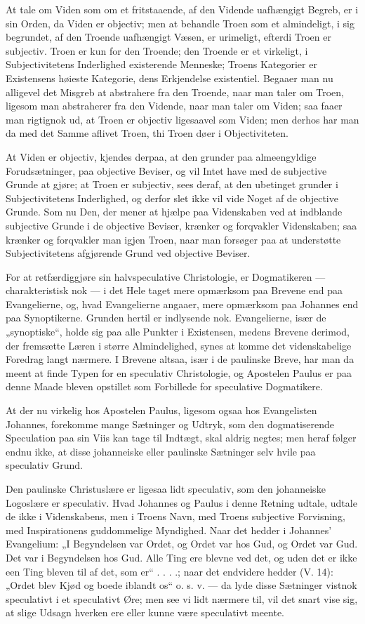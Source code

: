 \documentclass[12pt,a4paper]{book}
\newcommand{\opage}[1]{\marginnote{\footnotesize\textit{[#1]}}}
\begin{document}
At tale om Viden som om et fritstaaende, af den Vidende uafhængigt Begreb,
er i sin Orden, da Viden er objectiv; men at behandle Troen som et
almindeligt, i sig begrundet, af den Troende uafhængigt Væsen, er
urimeligt, efterdi Troen er subjectiv. Troen er kun for den Troende; den
Troende er et virkeligt, i Subjectivitetens Inderlighed existerende
Menneske; Troens Kategorier er Existensens høieste Kategorie, dens
Erkjendelse existentiel. Begaaer man nu alligevel det Misgreb at abstrahere
fra den Troende, naar man taler om Troen, ligesom man abstraherer fra den
Vidende, naar man taler om Viden; saa faaer man rigtignok ud, at Troen er
objectiv ligesaavel som Viden; men derhos har man da med det Samme aflivet
Troen, thi Troen døer i Objectiviteten.

At Viden er objectiv, kjendes derpaa, at den grunder paa almeengyldige
Forudsætninger, paa objective Beviser, og vil Intet have med de subjective
Grunde at gjøre; at Troen er subjectiv, sees deraf, at den ubetinget
grunder i Subjectivitetens Inderlighed, og derfor slet ikke vil vide Noget
af de objective Grunde. Som nu Den, der mener at hjælpe paa Videnskaben ved
at indblande subjective Grunde i de objective Beviser, krænker og forqvakler
Videnskaben; saa krænker og forqvakler man igjen Troen, naar man forsøger
paa at understøtte Subjectivitetens afgjørende Grund ved objective Beviser.

For at retfærdiggjøre sin halvspeculative Christologie, er Dogmatikeren ---
charakteristisk nok --- i det Hele taget mere opmærksom paa Brevene end paa
Evangelierne, og, hvad Evangelierne angaaer, mere opmærksom paa Johannes
end paa Synoptikerne. Grunden hertil er indlysende nok. Evangelierne, især
de „synoptiske“, holde sig paa alle Punkter i Existensen, medens
\opage{103} Brevene derimod, der fremsætte Læren i større Almindelighed, synes at komme
det videnskabelige Foredrag langt nærmere. I Brevene altsaa, især i de
paulinske Breve, har man da meent at finde Typen for en speculativ
Christologie, og Apostelen Paulus er paa denne Maade bleven opstillet som
Forbillede for speculative Dogmatikere.

At der nu virkelig hos Apostelen Paulus, ligesom ogsaa hos Evangelisten
Johannes, forekomme mange Sætninger og Udtryk, som den dogmatiserende
Speculation paa sin Viis kan tage til Indtægt, skal aldrig negtes; men
heraf følger endnu ikke, at disse johanneiske eller paulinske Sætninger
selv hvile paa speculativ Grund.

Den paulinske Christuslære er ligesaa lidt speculativ, som den johanneiske
Logoslære er speculativ. Hvad Johannes og Paulus i denne Retning udtale,
udtale de ikke i Videnskabens, men i Troens Navn, med Troens subjective
Forvisning, med Inspirationens guddommelige Myndighed. Naar det hedder i
Johannes' Evangelium: „I Begyndelsen var Ordet, og Ordet var hos Gud, og
Ordet var Gud. Det var i Begyndelsen hos Gud. Alle Ting ere blevne ved det,
og uden det er ikke een Ting bleven til af det, som er“ . . . .; naar det
endvidere hedder (V. 14): „Ordet blev Kjød og boede iblandt os“ o. s. v.
--- da lyde disse Sætninger vistnok speculativt i et speculativt Øre; men
see vi lidt nærmere til, vil det snart vise sig, at slige Udsagn hverken
ere eller kunne være speculativt meente.
\end{document}
